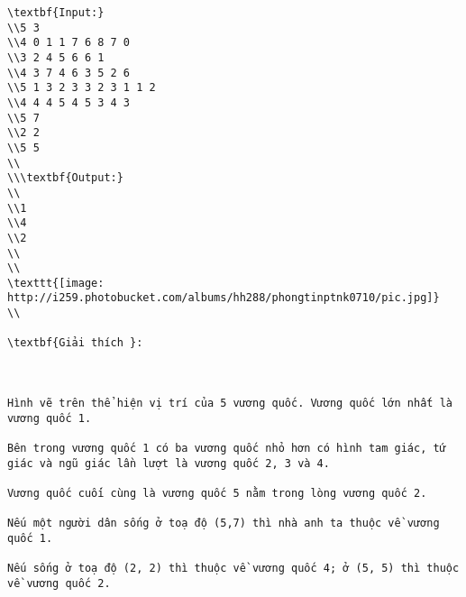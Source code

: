 \begin{verbatim}
\textbf{Input:}
\\5 3
\\4 0 1 1 7 6 8 7 0
\\3 2 4 5 6 6 1
\\4 3 7 4 6 3 5 2 6
\\5 1 3 2 3 3 2 3 1 1 2
\\4 4 4 5 4 5 3 4 3
\\5 7
\\2 2
\\5 5
\\
\\\textbf{Output:}
\\
\\1
\\4
\\2
\\
\\
\texttt{[image: http://i259.photobucket.com/albums/hh288/phongtinptnk0710/pic.jpg]}
\\

\textbf{Giải thích }: 

 

Hình vẽ trên thể hiện vị trí của 5 vương quốc. Vương quốc lớn nhất là vương quốc 1. 

Bên trong vương quốc 1 có ba vương quốc nhỏ hơn có hình tam giác, tứ giác và ngũ giác lần lượt là vương quốc 2, 3 và 4.

Vương quốc cuối cùng là vương quốc 5 nằm trong lòng vương quốc 2. 

Nếu một người dân sống ở toạ độ (5,7) thì nhà anh ta thuộc về vương quốc 1. 

Nếu sống ở toạ độ (2, 2) thì thuộc về vương quốc 4; ở (5, 5) thì thuộc về vương quốc 2.\end{verbatim}